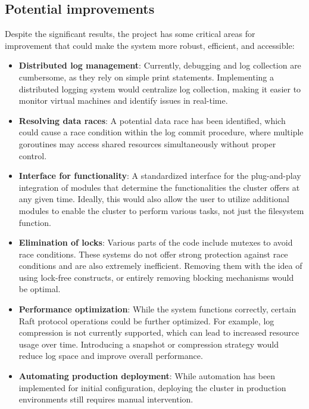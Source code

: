 \subsection{Potential improvements}
Despite the significant results, the project has some critical areas for improvement 
that could make the system more robust, efficient, and accessible:
\begin{itemize}
  \item \textbf{Distributed log management}: Currently, debugging and log collection 
    are cumbersome, as they rely on simple print statements. Implementing a 
    distributed logging system would centralize log collection, making it easier 
    to monitor virtual machines and identify issues in real-time.

  \item \textbf{Resolving data races}: A potential data race has been identified, 
    which could cause a race condition within the log commit procedure, where 
    multiple goroutines may access shared resources simultaneously without proper control. 

  \item \textbf{Interface for functionality}: A standardized interface for the plug-and-play 
    integration of modules that determine the functionalities the cluster offers at any given 
    time. Ideally, this would also allow the user to utilize additional modules to enable 
    the cluster to perform various tasks, not just the filesystem function.

  \item \textbf{Elimination of locks}: Various parts of the code include mutexes to avoid 
    race conditions. These systems do not offer strong protection against race conditions 
    and are also extremely inefficient. Removing them with the idea of using lock-free constructs,
    or entirely removing blocking mechanisms would be optimal.

  \item \textbf{Performance optimization}: While the system functions correctly, 
    certain Raft protocol operations could be further optimized. For example, 
    log compression is not currently supported, which can lead to increased 
    resource usage over time. Introducing a snapshot or compression strategy 
    would reduce log space and improve overall performance.

  \item \textbf{Automating production deployment}: While automation has been implemented 
    for initial configuration, deploying the cluster in production environments 
    still requires manual intervention.


\end{itemize}
